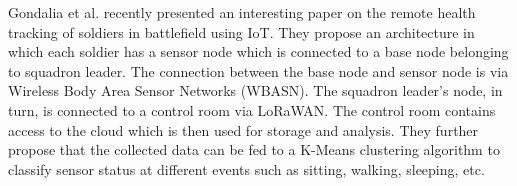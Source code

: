 Gondalia et al.\cite{gondalia2018iot} recently presented an interesting paper on the remote health tracking of soldiers in battlefield using IoT. They propose an architecture in which each soldier has a sensor node which is connected to a base node belonging to squadron leader. The connection between the base node and sensor node is via Wireless Body Area Sensor Networks (WBASN). The squadron leader's node, in turn, is connected to a control room via LoRaWAN. The control room contains access to the cloud which is then used for storage and analysis. They further propose that the collected data can be fed to a K-Means clustering algorithm to classify sensor status at different events such as sitting, walking, sleeping, etc.

